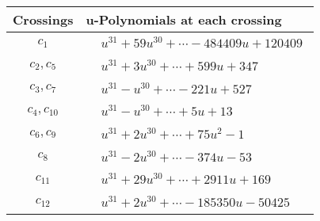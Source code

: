 \documentclass[1p]{elsarticle_modified}
\theoremstyle{definition}
\begin{document}
\begin{tabular}{m{50pt}|m{274pt}}
Crossings & \hspace{64pt}u-Polynomials at each crossing \\
\hline $$\begin{aligned}c_{1}\end{aligned}$$&$\begin{aligned}
&u^{31}+59 u^{30}+\cdots-484409 u+120409
\end{aligned}$\\
\hline $$\begin{aligned}c_{2},c_{5}\end{aligned}$$&$\begin{aligned}
&u^{31}+3 u^{30}+\cdots+599 u+347
\end{aligned}$\\
\hline $$\begin{aligned}c_{3},c_{7}\end{aligned}$$&$\begin{aligned}
&u^{31}- u^{30}+\cdots-221 u+527
\end{aligned}$\\
\hline $$\begin{aligned}c_{4},c_{10}\end{aligned}$$&$\begin{aligned}
&u^{31}- u^{30}+\cdots+5 u+13
\end{aligned}$\\
\hline $$\begin{aligned}c_{6},c_{9}\end{aligned}$$&$\begin{aligned}
&u^{31}+2 u^{30}+\cdots+75 u^2-1
\end{aligned}$\\
\hline $$\begin{aligned}c_{8}\end{aligned}$$&$\begin{aligned}
&u^{31}-2 u^{30}+\cdots-374 u-53
\end{aligned}$\\
\hline $$\begin{aligned}c_{11}\end{aligned}$$&$\begin{aligned}
&u^{31}+29 u^{30}+\cdots+2911 u+169
\end{aligned}$\\
\hline $$\begin{aligned}c_{12}\end{aligned}$$&$\begin{aligned}
&u^{31}+2 u^{30}+\cdots-185350 u-50425
\end{aligned}$\\
\hline
\end{tabular}\\~\\
\end{document}
